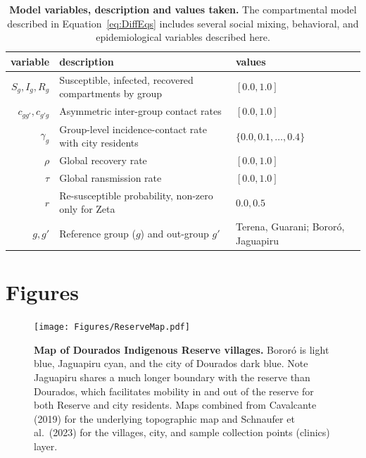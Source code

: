 \documentclass[
  letterpaper,
  abstract]{scrartcl}
\begin{document}
\begin{table}[h]
  \centering
  \caption{\textbf{Model variables, description and values taken.} The
  compartmental model described in Equation~\ref{eq:DiffEqs} includes several
social mixing, behavioral, and epidemiological variables described here.}
  \label{tab:Variables}
  \begin{tabular}{rlp{1.3in}} 
    \toprule
    variable & description & values \\ 
    \midrule 
    $S_g,I_g,R_g$ & Susceptible, infected, recovered compartments by group & $[0.0,1.0]$ \\
    $c_{gg'},c_{g'g}$ & Asymmetric inter-group contact rates & $[0.0,1.0]$ \\
    $\gamma_g$ & Group-level incidence-contact rate with city residents &
      $\{0.0,0.1,\ldots,0.4\}$ \\
    $\rho$ & Global recovery rate & $[0.0,1.0]$ \\
    $\tau$ & Global ransmission rate & $[0.0,1.0]$ \\
    $r$    & Re-susceptible probability, non-zero only for Zeta & $0.0,0.5$ \\
    $g,g'$ & Reference group ($g$) and out-group $g'$ & Terena, Guarani; Bororó, Jaguapiru \\
    \bottomrule
  \end{tabular} 
\end{table}

\section{Figures}

\begin{figure}[H]

\centering
\caption{\textbf{Map of Dourados Indigenous Reserve villages.} Bororó is light
blue, Jaguapiru cyan, and the city of Dourados dark blue. Note
Jaguapiru shares a much longer boundary with the reserve than Dourados,
which facilitates mobility in and out of the reserve for both Reserve
and city residents. Maps combined from Cavalcante (2019) for the underlying
topographic map and Schnaufer et al.~(2023) for the villages, city, and 
sample collection points (clinics) layer.}
\label{fig:Map}
\vspace{0.3em}
{\texttt{[image: Figures/ReserveMap.pdf]}}
\end{figure}%
\end{document}
